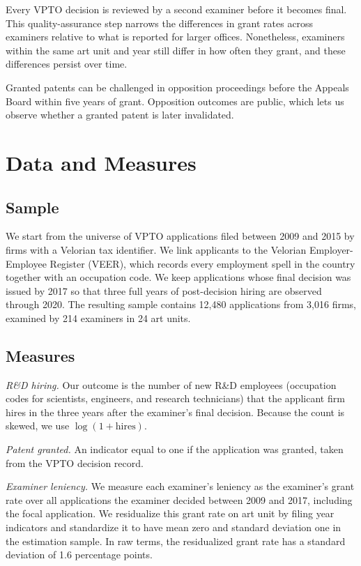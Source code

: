 \documentclass[11pt]{article}
\begin{document}
Every VPTO decision is reviewed by a second examiner before it becomes final. This quality-assurance step narrows the differences in grant rates across examiners relative to what is reported for larger offices. Nonetheless, examiners within the same art unit and year still differ in how often they grant, and these differences persist over time.

Granted patents can be challenged in opposition proceedings before the Appeals Board within five years of grant. Opposition outcomes are public, which lets us observe whether a granted patent is later invalidated.

\section{Data and Measures}

\subsection{Sample}

We start from the universe of VPTO applications filed between 2009 and 2015 by firms with a Velorian tax identifier. We link applicants to the Velorian Employer-Employee Register (VEER), which records every employment spell in the country together with an occupation code. We keep applications whose final decision was issued by 2017 so that three full years of post-decision hiring are observed through 2020. The resulting sample contains 12,480 applications from 3,016 firms, examined by 214 examiners in 24 art units.

\subsection{Measures}

\textit{R\&D hiring.} Our outcome is the number of new R\&D employees (occupation codes for scientists, engineers, and research technicians) that the applicant firm hires in the three years after the examiner's final decision. Because the count is skewed, we use $\log(1 + \text{hires})$.

\textit{Patent granted.} An indicator equal to one if the application was granted, taken from the VPTO decision record.

\textit{Examiner leniency.} We measure each examiner's leniency as the examiner's grant rate over all applications the examiner decided between 2009 and 2017, including the focal application. We residualize this grant rate on art unit by filing year indicators and standardize it to have mean zero and standard deviation one in the estimation sample. In raw terms, the residualized grant rate has a standard deviation of 1.6 percentage points.
\end{document}
